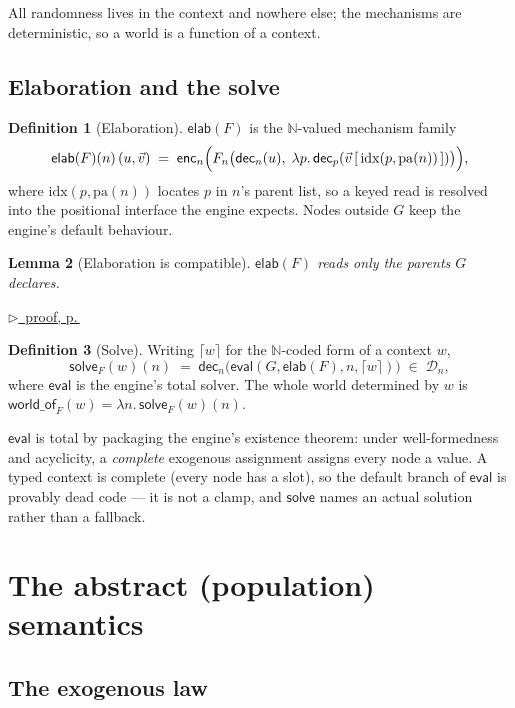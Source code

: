 \documentclass[11pt,a4paper]{article}
\theoremstyle{definition}
\newtheorem{definition}{Definition}[section]
\theoremstyle{plain}
\newtheorem{lemma}[definition]{Lemma}
\theoremstyle{remark}
\newcommand{\pa}{\mathrm{pa}}
\newcommand{\dom}{\mathcal{D}}
\newcommand{\solve}{\mathsf{solve}}
\newcommand{\enc}{\mathsf{enc}}
\newcommand{\dect}{\mathsf{dec}}
\newcommand{\elab}{\mathsf{elab}}
\newcommand{\ev}{\mathsf{eval}}
\newcommand{\pfref}[1]{%
  \par\smallskip\noindent
  \hyperref[pf:#1]{\small$\triangleright$\ proof, p.\,\pageref{pf:#1}}\par\smallskip}
\begin{document}
All randomness lives in the context and nowhere else; the mechanisms are
deterministic, so a world is a function of a context.

\subsection{Elaboration and the solve}
\label{sec:elab}

\begin{definition}[Elaboration]
$\elab(F)$ is the $\mathbb{N}$-valued mechanism family
\[
  \elab(F)(n)\,(u, \vec{v})
  \;=\;
  \enc_n\Bigl(F_n\bigl(\dect_n(u),\;
      \lambda p.\, \dect_p(\vec v\,[\,\mathrm{idx}(p,\pa(n))\,])\bigr)\Bigr),
\]
where $\mathrm{idx}(p,\pa(n))$ locates $p$ in $n$'s parent list, so a
keyed read is resolved into the positional interface the engine expects.
Nodes outside $G$ keep the engine's default behaviour.
\end{definition}

\begin{lemma}[Elaboration is compatible]
\label{lem:elabcompat}
$\elab(F)$ reads only the parents $G$ declares.
\end{lemma}

\pfref{lem:elabcompat}

\begin{definition}[Solve]
Writing $\lceil w \rceil$ for the $\mathbb N$-coded form of a context $w$,
\[
  \solve_F(w)(n) \;=\; \dect_n\bigl(\ev(G,\elab(F),n,\lceil w\rceil)\bigr)
  \;\in\; \dom_n ,
\]
where $\ev$ is the engine's total solver. The whole world determined by $w$
is $\mathsf{world\_of}_F(w) = \lambda n.\,\solve_F(w)(n)$.
\end{definition}

$\ev$ is total by packaging the engine's existence theorem: under
well-formedness and acyclicity, a \emph{complete} exogenous assignment
assigns every node a value. A typed context is complete (every node has a
slot), so the default branch of $\ev$ is provably dead code --- it is not a
clamp, and $\solve$ names an actual solution rather than a fallback.

\section{The abstract (population) semantics}

\subsection{The exogenous law}
\end{document}
